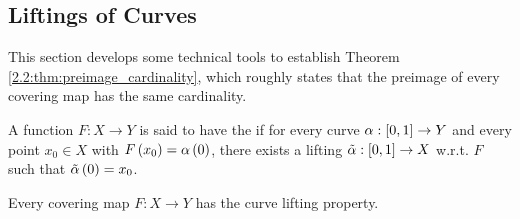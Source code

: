 \documentclass[../Moduli_Spaces_of_Riemann_Surfaces.tex]{subfiles}
\begin{document}
    \subsection{Liftings of Curves}
    This section develops some technical tools to establish Theorem \ref{2.2:thm:preimage_cardinality}, which roughly states that the preimage of every covering map has the same cardinality.
    \begin{definition}
        A function $F:X\to Y$ is said to have the  if for every curve $\alpha:\left[0,1\right]\to Y$ and every point $x_0\in X$ with $F\left(x_0\right)=\alpha\left(0\right)$, there exists a lifting $\tilde{\alpha}:\left[0,1\right]\to X$ w.r.t. $F$ such that $\tilde{\alpha}\left(0\right)=x_0$.
    \end{definition}
    \begin{lemma}
        Every covering map $F:X\to Y$ has the curve lifting property.
    \end{lemma}
\end{document}
